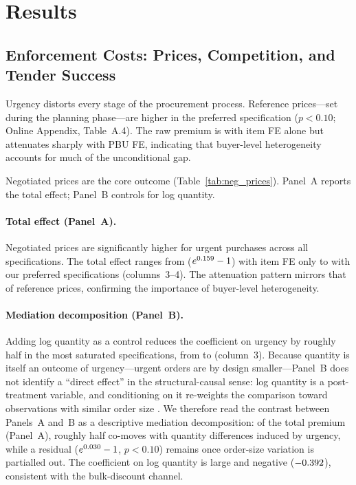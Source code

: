 \section{Results}
\label{sec:results}

\subsection{Enforcement Costs: Prices, Competition, and Tender Success}
\label{sec:main_results}

Urgency distorts every stage of the procurement process. Reference prices---set during the planning phase---are \BPrefPctPreferred{} higher in the preferred specification ($p < 0.10$; Online Appendix, Table~A.4). The raw premium is \BPrefPctItemFE{} with item FE alone but attenuates sharply with PBU FE, indicating that buyer-level heterogeneity accounts for much of the unconditional gap.

Negotiated prices are the core outcome (Table~\ref{tab:neg_prices}). Panel~A reports the total effect; Panel~B controls for log quantity.


\paragraph{Total effect (Panel~A).}
Negotiated prices are significantly higher for urgent purchases across all specifications. The total effect ranges from \BPnegPctItemFE{} ($e^{0.159}-1$) with item FE only to \BPnegPctRange{} with our preferred specifications (columns~3--4). The attenuation pattern mirrors that of reference prices, confirming the importance of buyer-level heterogeneity.

\paragraph{Mediation decomposition (Panel~B).}
Adding log quantity as a control reduces the coefficient on urgency by roughly half in the most saturated specifications, from \BPnegPanelAcoefShort{} to \BPnegPanelBcoefShort{} (column~3).\label{fn:mediation-anchor} Because quantity is itself an outcome of urgency---urgent orders are by design smaller---Panel~B does not identify a ``direct effect'' in the structural-causal sense: log quantity is a post-treatment variable, and conditioning on it re-weights the comparison toward observations with similar order size \citep{acharya2016explaining}. We therefore read the contrast between Panels~A and~B as a descriptive mediation decomposition: of the \BPnegPctHeadline{} total premium (Panel~A), roughly half co-moves with quantity differences induced by urgency, while a residual \BPnegPanelBpct{} ($e^{0.030}-1$, $p < 0.10$) remains once order-size variation is partialled out. The coefficient on log quantity is large and negative ($-0.392$), consistent with the bulk-discount channel.

